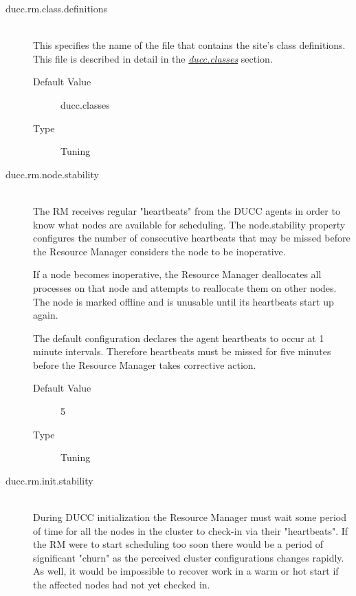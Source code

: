 \begin{description}
        \item[ducc.rm.class.definitions] \hfill \\
          This specifies the name of the file that contains the site's class definitions. This file is 
          described in detail in the \hyperref[sec:ducc.classes]{\em ducc.classes} section.
          \begin{description}
            \item[Default Value] ducc.classes 
            \item[Type] Tuning 
          \end{description}
          
        \item[ducc.rm.node.stability] \hfill \\
          The RM receives regular "heartbeats" from the DUCC agents in order to know what 
          nodes are available for scheduling. The node.stability property configures the number of 
          consecutive heartbeats that may be missed before the Resource Manager considers the 
          node to be inoperative. 

          If a node becomes inoperative, the Resource Manager deallocates all processes on that 
          node and attempts to reallocate them on other nodes. The node is marked offline and is 
          unusable until its heartbeats start up again. 
          
          The default configuration declares the agent heartbeats to occur at 1 minute intervals. 
          Therefore heartbeats must be missed for five minutes before the Resource Manager takes 
          corrective action. 
          \begin{description}
            \item[Default Value] 5 
            \item[Type] Tuning 
          \end{description}
          

        \item[ducc.rm.init.stability] \hfill \\
          During DUCC initialization the Resource Manager must wait some period of time for 
          all the nodes in the cluster to check-in via their "heartbeats". If the RM were to start 
          scheduling too soon there would be a period of significant "churn" as the perceived cluster 
          configurations changes rapidly. As well, it would be impossible to recover work in a warm 
          or hot start if the affected nodes had not yet checked in. 
          

\end{description}
